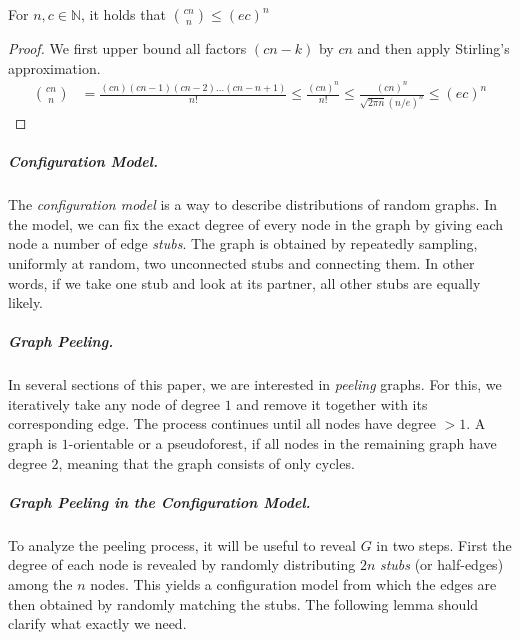 \documentclass[a4paper,USenglish,cleveref]{lipics-v2021}
\newcommand{\myparagraph}[1]{\subparagraph*{#1}}
\begin{document}
\begin{lemma}
  \label{lem:binomial}
  For $n,c\in\mathbb{N}$, it holds that ${cn \choose n} \leq \left(ec\right)^n$
\end{lemma}
\begin{proof}
  We first upper bound all factors $(cn-k)$ by $cn$ and then apply Stirling's approximation.
  \begin{align*}
    {cn \choose n}
      & = \frac{(cn)(cn-1)(cn-2)\ldots(cn-n+1)}{n!}
      \leq \frac{(cn)^n}{n!}
      \leq \frac{(cn)^n}{\sqrt{2 \pi n}\left(n/e\right)^n}
      \leq \left(ec\right)^n
    \tag*{\qedhere}
  \end{align*}
\end{proof}

\myparagraph{Configuration Model.}\label{ss:configurationModel}
The \emph{configuration model} \cite{newman2010networks} is a way to describe distributions of random graphs.
In the model, we can fix the exact degree of every node in the graph by giving each node a number of edge \emph{stubs}.
The graph is obtained by repeatedly sampling, uniformly at random, two unconnected stubs and connecting them.
In other words, if we take one stub and look at its partner, all other stubs are equally likely.

\myparagraph{Graph Peeling.}\label{ss:graphPeelingPrelim}
In several sections of this paper, we are interested in \emph{peeling} \cite{walzer2021peeling,Molloy05:Cores-in-random-hypergraphs,Luczak:A-simple-solution} graphs.
For this, we iteratively take any node of degree $1$ and remove it together with its corresponding edge.
The process continues until all nodes have degree $>1$.
A graph is $1$-orientable or a pseudoforest, if all nodes in the remaining graph have degree $2$, meaning that the graph consists of only cycles.

\myparagraph{Graph Peeling in the Configuration Model.}
To analyze the peeling process, it will be useful to reveal $G$ in two steps.
First the degree of each node is revealed by randomly distributing $2n$ \emph{stubs} (or half-edges) among the $n$ nodes.
This yields a configuration model from which the edges are then obtained by randomly matching the stubs.
The following lemma should clarify what exactly we need.
\end{document}

